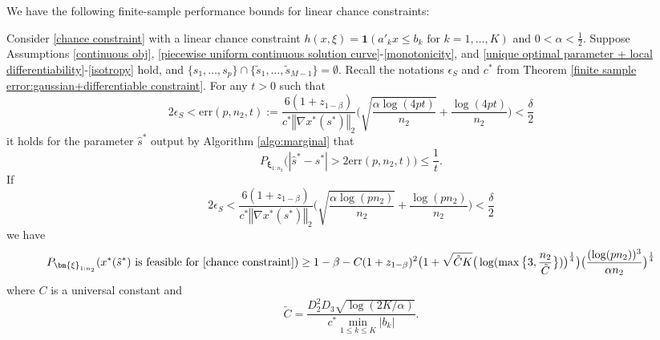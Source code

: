 \documentclass[mnsc,blindrev]{informs4} %
\newcommand{\norm}[1]{\left \Vert #1 \right\Vert}
\newcommand{\abs}[1]{\left \vert #1 \right\vert}
\begin{document}
 We have the following finite-sample performance bounds for linear chance constraints:
 \begin{theorem}\label{finite sample error:gaussian+linear chance constraint}
 Consider \eqref{chance constraint} with a linear chance constraint $h(x,\xi)=\mathbf{1}(a'_kx\leq b_k\text{ for }k=1,\ldots,K)$ and $0<\alpha<\frac{1}{2}$. Suppose Assumptions \ref{continuous obj}, \ref{piecewise uniform continuous solution curve}-\ref{monotonicity}, and \ref{unique optimal parameter + local differentiability}-\ref{isotropy} hold, and $\{s_1,\ldots,s_p\}\cap \{\tilde s_1,\ldots,\tilde s_{M-1}\}=\emptyset$. Recall the notations $\epsilon_S$ and $c^*$ from Theorem \ref{finite sample error:gaussian+differentiable constraint}. For any $t>0$ such that
 \begin{equation*}
2\epsilon_S<\mathrm{err}(p,n_2,t):=\frac{6(1+z_{1-\beta})}{c^*\norm{\nabla x^*(s^*)}_2}\big(\sqrt{\frac{\alpha\log (4pt)}{n_2}}+\frac{\log (4pt)}{n_2}\big)<\frac{\delta}{2}
 \end{equation*}
 it holds for the parameter $\hat s^*$ output by Algorithm \ref{algo:marginal} that
 $$P_{\bm{\xi}_{1:n_2}}\big(\abs{\hat s^*-s^*}>2\mathrm{err}(p,n_2,t)\big)\leq \frac{1}{t}.
 $$
If
 \begin{equation*}
     2\epsilon_S<\frac{6(1+z_{1-\beta})}{c^*\norm{\nabla x^*(s^*)}_2}\big(\sqrt{\frac{\alpha\log (pn_2)}{n_2}}+\frac{\log (pn_2)}{n_2}\big)<\frac{\delta}{2}
 \end{equation*}
 we have
 \begin{equation}\label{feasibility error:gaussian+chance constraint}
    P_{\bm{\xi}_{1:n_2}}(x^*(\hat{s}^*)\text{ is feasible for \eqref{chance constraint}})\geq 1-\beta-C(1+z_{1-\beta})^2\big(1+\sqrt{\tilde C K}\big(\log(\max\big\{3,\frac{n_2}{\tilde C}\big\})\big)^{\frac{1}{4}}\big)\big(\frac{(\log(pn_2))^3}{\alpha n_2}\big)^{\frac{1}{4}}
 \end{equation}
 where $C$ is a universal constant and
 \begin{equation*}
 \tilde C=\frac{D_2^2D_3\sqrt{\log(2K/\alpha)}}{c^*\min_{1\leq k\leq K}\lvert b_k\rvert}.
 \end{equation*}
\end{theorem}
\end{document}
